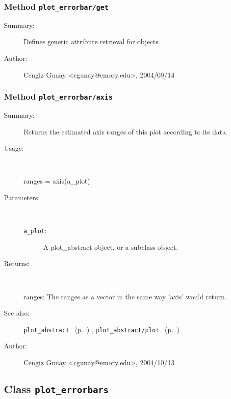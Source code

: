 \subsubsection[Method \texttt{get}]{Method \texttt{plot\_errorbar/get}}%
%
\label{ref_plot_errorbar__get}%
\hypertarget{ref_plot_errorbar__get}{}%
\begin{description}
\item[Summary:]Defines generic attribute retrieval for objects.
%
%
%
%
%
%
%
\item[Author:]%
Cengiz Gunay <cgunay@emory.edu>, 2004/09/14%
\end{description}
\methodline%
\subsubsection[Method \texttt{axis}]{Method \texttt{plot\_errorbar/axis}}%
%
\label{ref_plot_errorbar__axis}%
\hypertarget{ref_plot_errorbar__axis}{}%
\begin{description}
\item[Summary:]Returns the estimated axis ranges of this plot according to its data.
%
\item[Usage:]~%
\begin{lyxcode}%
ranges = axis(a\_plot)
%
\end{lyxcode}%
%
%
\item[Parameters:]~
\begin{description}%
\item[\texttt{a\_plot}:]
 A plot\_abstract object, or a subclass object.
\end{description}%
%
\item[Returns:]~

	ranges: The ranges as a vector in the same way 'axis' would return.
%
%
\item[See also:]%
\hyperlink{ref_plot_abstract}{\texttt{plot\_abstract}}%
\ (p.~\pageref{ref_plot_abstract})%
%
, \hyperlink{ref_plot_abstract__plot}{\texttt{plot\_abstract/plot}}%
\ (p.~\pageref{ref_plot_abstract__plot})%
%
%
\item[Author:]%
Cengiz Gunay <cgunay@emory.edu>, 2004/10/13%
\end{description}
\methodline%
\subsection{Class \texttt{plot\_errorbars}}%
%
\label{ref_plot_errorbars}%
\hypertarget{ref_plot_errorbars}{}%
